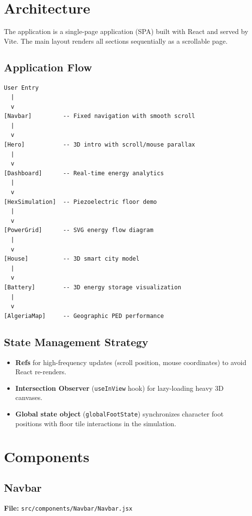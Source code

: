 \documentclass[12pt,a4paper]{article}
\begin{document}
\section{Architecture}

The application is a single-page application (SPA) built with React and served by Vite. The main layout renders all sections sequentially as a scrollable page.

\subsection{Application Flow}

\begin{verbatim}
User Entry
  |
  v
[Navbar]         -- Fixed navigation with smooth scroll
  |
  v
[Hero]           -- 3D intro with scroll/mouse parallax
  |
  v
[Dashboard]      -- Real-time energy analytics
  |
  v
[HexSimulation]  -- Piezoelectric floor demo
  |
  v
[PowerGrid]      -- SVG energy flow diagram
  |
  v
[House]          -- 3D smart city model
  |
  v
[Battery]        -- 3D energy storage visualization
  |
  v
[AlgeriaMap]     -- Geographic PED performance
\end{verbatim}

\subsection{State Management Strategy}
\begin{itemize}
    \item \textbf{Refs} for high-frequency updates (scroll position, mouse coordinates) to avoid React re-renders.
    \item \textbf{Intersection Observer} (\texttt{useInView} hook) for lazy-loading heavy 3D canvases.
    \item \textbf{Global state object} (\texttt{globalFootState}) synchronizes character foot positions with floor tile interactions in the simulation.
\end{itemize}

\section{Components}

\subsection{Navbar}
\textbf{File:} \texttt{src/components/Navbar/Navbar.jsx}
\end{document}
